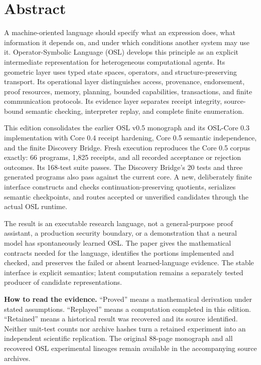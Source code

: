 \documentclass[11pt]{article}
\begin{document}
\KomorebiCover
{}


\section*{Abstract}
A machine-oriented language should specify what an expression does, what information it depends on, and under which conditions another system may use it. Operator-Symbolic Language (OSL) develops this principle as an explicit intermediate representation for heterogeneous computational agents. Its geometric layer uses typed state spaces, operators, and structure-preserving transport. Its operational layer distinguishes access, provenance, endorsement, proof resources, memory, planning, bounded capabilities, transactions, and finite communication protocols. Its evidence layer separates receipt integrity, source-bound semantic checking, interpreter replay, and complete finite enumeration.

This edition consolidates the earlier OSL v0.5 monograph and its OSL-Core 0.3 implementation with Core 0.4 receipt hardening, Core 0.5 semantic independence, and the finite Discovery Bridge. Fresh execution reproduces the Core 0.5 corpus exactly: 66 programs, 1,825 receipts, and all recorded acceptance or rejection outcomes. Its 168-test suite passes. The Discovery Bridge's 20 tests and three generated programs also pass against the current core. A new, deliberately finite interface constructs and checks continuation-preserving quotients, serializes semantic checkpoints, and routes accepted or unverified candidates through the actual OSL runtime.

The result is an executable research language, not a general-purpose proof assistant, a production security boundary, or a demonstration that a neural model has spontaneously learned OSL. The paper gives the mathematical contracts needed for the language, identifies the portions implemented and checked, and preserves the failed or absent learned-language evidence. The stable interface is explicit semantics; latent computation remains a separately tested producer of candidate representations.

\begin{scopebox}
\textbf{How to read the evidence.} ``Proved'' means a mathematical derivation under stated assumptions. ``Replayed'' means a computation completed in this edition. ``Retained'' means a historical result was recovered and its source identified. Neither unit-test counts nor archive hashes turn a retained experiment into an independent scientific replication. The original 88-page monograph and all recovered OSL experimental lineages remain available in the accompanying source archives.
\end{scopebox}
\clearpage
\tableofcontents\clearpage
\end{document}
